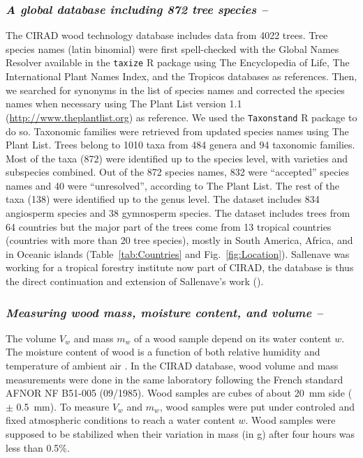 \documentclass[a4paper, 12pt, leqno, dvipsnames]{article}\usepackage[]{graphicx}\usepackage[]{color}
\begin{document}
\subsubsection*{\textnormal{\textit{A global database including 872 tree species --}}}

The CIRAD wood technology database includes data from 4022 trees. Tree species names (latin binomial) were first spell-checked with the Global Names Resolver available in the \texttt{taxize} R package \citep{Chamberlain2013} using The Encyclopedia of Life, The International Plant Names Index, and the Tropicos databases as references. Then, we searched for synonyms in the list of species names and corrected the species names when necessary using The Plant List version 1.1 (\url{http://www.theplantlist.org}) as reference. We used the \texttt{Taxonstand} R package \citep{Cayuela2017} to do so. Taxonomic families were retrieved from updated species names using The Plant List. Trees belong to 1010 taxa from 484 genera and 94 taxonomic families. Most of the taxa (872) were identified up to the species level, with varieties and subspecies combined. Out of the 872 species names, 832 were ``accepted'' species names and 40 were ``unresolved'', according to The Plant List. The rest of the taxa (138) were identified up to the genus level. The dataset includes 834 angiosperm species and 38 gymnosperm species. The dataset includes trees from 64 countries but the major part of the trees come from 13 tropical countries (countries with more than 20 tree species), mostly in South America, Africa, and in Oceanic islands (Table~\ref{tab:Countries} and Fig.~\ref{fig:Location}). Sallenave was working for a tropical forestry institute now part of CIRAD, the database is thus the direct continuation and extension of Sallenave's work (\citeyear{Sallenave1955, Sallenave1964, Sallenave1971}).

\subsubsection*{\textnormal{\textit{Measuring wood mass, moisture content, and volume --}}}
\label{seq:mass-volume}

The volume $V_w$ and mass $m_w$ of a wood sample depend on its water content $w$. The moisture content of wood is a function of both relative humidity and temperature of ambient air \citep{Hailwood1946, Glass2010}. In the CIRAD database, wood volume and mass measurements were done in the same laboratory following the French standard AFNOR NF B51-005 (09/1985). Wood samples are cubes of about 20~mm side ($\pm$ 0.5~mm). To measure $V_w$ and $m_w$, wood samples were put under controled and fixed atmospheric conditions to reach a water content $w$. Wood samples were supposed to be stabilized when their variation in mass (in g) after four hours was less than 0.5\%.
\end{document}
